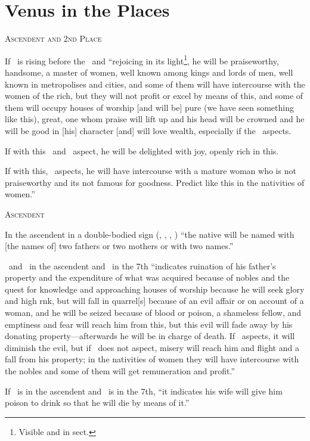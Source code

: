 \section{Venus in the Places}
\noindent\textsc{Ascendent and 2nd Place}

If \Venus\, is rising before the \Sun\, and ``rejoicing in its light\footnote{Visible and in sect.}, he will be praiseworthy, handsome, a master of women, well known among kings and lords of men, well known in metropolises and cities, and some of them will have intercourse with the women of the rich, but they will not profit or excel by means of this, and some of them will occupy houses of worship [and will be] pure (we have seen something like this), great, one whom praise will lift up and his head will be crowned and he will be good in [his] character [and] will love wealth, especially if the \Moon\, aspects.

If with this \Mars\, and \Mercury\, aspect, he will be delighted with joy, openly rich in this. 

If with this, \Saturn\, aspects, he will have intercourse with a mature woman who is not praiseworthy and its not famous for goodness. Predict like this in the nativities of women.''

\noindent\textsc{Ascendent}

In the ascendent in a double-bodied sign (\Gemini, \Virgo, \Sagittarius, \Pisces) ``the native will be named with [the names of] two fathers or two mothers or with two names.''

\Venus\, and \Mercury\, in the ascendent and \Mars\, in the 7th ``indicates ruination of his father's property and the expenditure of what was acquired because of nobles and the quest for knowledge and approaching houses of worship because he will seek glory and high rnk, but will fall in quarrel[s] because of an evil affair or on account of a woman, and he will be seized because of blood or poison, a shameless fellow, and emptiness and fear will reach him from this, but this evil will fade away by his donating property---afterwards he will be in charge of death. If \Jupiter\,  aspects, it will diminish the evil, but if \Jupiter\, does not aspect, misery will reach him and flight and a fall from his property; in the nativities of women they will have intercourse with the nobles and some of them will get remuneration and profit.''

If \Venus\, is in the ascendent and \Saturn\, is in the 7th, ``it indicates his wife will give him poison to drink so that he will die by means of it.''

